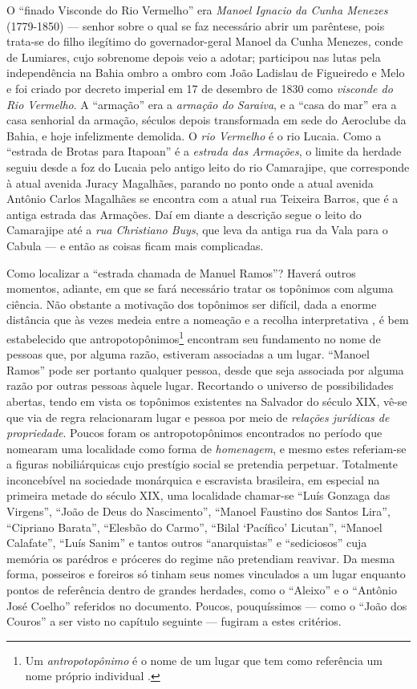 O ``finado Visconde do Rio Vermelho'' era \textit{Manoel Ignacio da Cunha Menezes} (1779-1850) --- senhor sobre o qual se faz necessário abrir um parêntese, pois trata-se do filho ilegítimo do governador-geral Manoel da Cunha Menezes, conde de Lumiares, cujo sobrenome depois veio a adotar; participou nas lutas pela independência na Bahia ombro a ombro com João Ladislau de Figueiredo e Melo e foi criado por decreto imperial em 17 de desembro de 1830 como \textit{visconde do Rio Vermelho}. A ``armação'' era a \textit{armação do Saraiva}, e a ``casa do mar'' era a casa senhorial da armação, séculos depois transformada em sede do Aeroclube da Bahia, e hoje infelizmente demolida. O \textit{rio Vermelho} é o rio Lucaia. Como a ``estrada de Brotas para Itapoan'' é a \textit{estrada das Armações}, o limite da herdade seguiu desde a foz do Lucaia pelo antigo leito do rio Camarajipe, que corresponde à atual avenida Juracy Magalhães, parando no ponto onde a atual avenida Antônio Carlos Magalhães se encontra com a atual rua Teixeira Barros, que é a antiga estrada das Armações. Daí em diante a descrição segue o leito do Camarajipe até a \textit{rua Christiano Buys}, que leva da antiga rua da Vala para o Cabula --- e então as coisas ficam mais complicadas.

Como localizar a ``estrada chamada de Manuel Ramos''? Haverá outros momentos, adiante, em que se fará necessário tratar os topônimos com alguma ciência. Não obstante a motivação dos topônimos ser difícil, dada a enorme distância que às vezes medeia entre a nomeação e a recolha interpretativa \cite{aguilera_taxiproblema_1999}, é bem estabelecido que  antropotopônimos\footnote{Um \textit{antropotopônimo} é o nome de um lugar que tem como referência um nome próprio individual \cite{dick_taxotopo_1975, silva_eletopon_2017}.} encontram seu fundamento no nome de pessoas que, por alguma razão, estiveram associadas a um lugar. ``Manoel Ramos'' pode ser portanto qualquer pessoa, desde que seja associada por alguma razão por outras pessoas àquele lugar. Recortando o universo de possibilidades abertas, tendo em vista os topônimos existentes na Salvador do século XIX, vê-se que via de regra relacionaram lugar e pessoa por meio de \textit{relações jurídicas de propriedade}. Poucos foram os antropotopônimos encontrados no período que nomearam uma localidade como forma de \textit{homenagem}, e mesmo estes referiam-se a figuras nobiliárquicas cujo prestígio social se pretendia perpetuar. Totalmente inconcebível na sociedade monárquica e escravista brasileira, em especial na primeira metade do século XIX, uma localidade chamar-se ``Luís Gonzaga das Virgens'', ``João de Deus do Nascimento'', ``Manoel Faustino dos Santos Lira'', ``Cipriano Barata'', ``Elesbão do Carmo'', ``Bilal `Pacífico' Licutan'', ``Manoel Calafate'', ``Luís Sanim'' e tantos outros ``anarquistas'' e ``sediciosos'' cuja memória os parédros e próceres do regime não pretendiam reavivar. Da mesma forma, posseiros e foreiros só tinham seus nomes vinculados a um lugar enquanto pontos de referência dentro de grandes herdades, como o ``Aleixo'' e o ``Antônio José Coelho'' referidos no documento. Poucos, pouquíssimos --- como o ``João dos Couros'' a ser visto no capítulo seguinte --- fugiram a estes critérios. 

